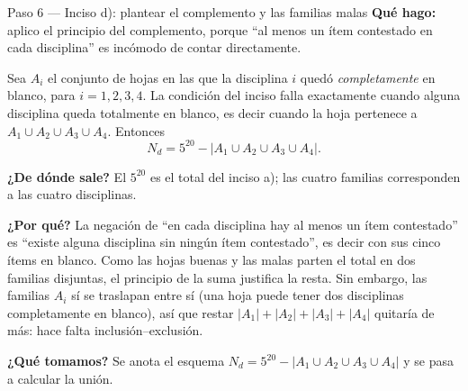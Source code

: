 \documentclass[11pt]{article}
\begin{document}
\begin{paso}{Paso 6 --- Inciso d): plantear el complemento y las familias malas}
\textbf{Qué hago:} aplico el principio del complemento, porque ``al menos un ítem contestado en cada disciplina'' es incómodo de contar directamente.

Sea $A_i$ el conjunto de hojas en las que la disciplina $i$ quedó \emph{completamente} en blanco, para $i=1,2,3,4$. La condición del inciso falla exactamente cuando alguna disciplina queda totalmente en blanco, es decir cuando la hoja pertenece a $A_1\cup A_2\cup A_3\cup A_4$. Entonces
\[
  N_d = 5^{20} - |A_1\cup A_2\cup A_3\cup A_4| .
\]

\textbf{¿De dónde sale?} El $5^{20}$ es el total del inciso a); las cuatro familias corresponden a las cuatro disciplinas.

\textbf{¿Por qué?} La negación de ``en cada disciplina hay al menos un ítem contestado'' es ``existe alguna disciplina sin ningún ítem contestado'', es decir con sus cinco ítems en blanco. Como las hojas buenas y las malas parten el total en dos familias disjuntas, el principio de la suma justifica la resta. Sin embargo, las familias $A_i$ sí se traslapan entre sí (una hoja puede tener dos disciplinas completamente en blanco), así que restar $|A_1|+|A_2|+|A_3|+|A_4|$ quitaría de más: hace falta inclusión--exclusión.

\textbf{¿Qué tomamos?} Se anota el esquema $N_d=5^{20}-|A_1\cup A_2\cup A_3\cup A_4|$ y se pasa a calcular la unión.
\end{paso}
\end{document}
